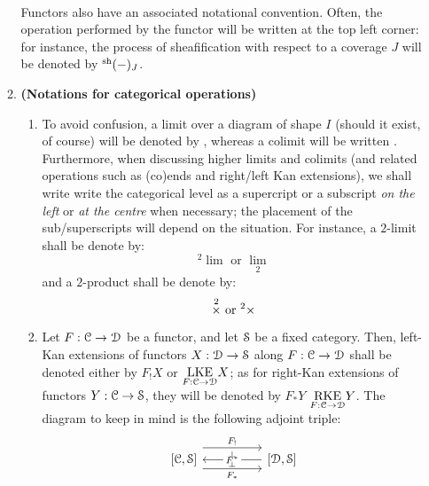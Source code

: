\begin{enumerate}
\begin{enumerate}
                \\
                Functors also have an associated notational convention. Often, the operation performed by the functor will be written at the top left corner: for instance, the process of sheafification with respect to a coverage $J$ will be denoted by ${}^{\sh}(-)_J$.
                \item \textbf{(Notations for categorical operations)} 
                    \begin{enumerate}
                        \item To avoid confusion, a limit over a diagram of shape $I$ (should it exist, of course) will be denoted by , whereas a colimit will be written . Furthermore, when discussing higher limits and colimits (and related operations such as (co)ends and right/left Kan extensions), we shall write write the categorical level as a supercript or a subscript \textit{on the left} or \textit{at the centre} when necessary; the placement of the sub/superscripts will depend on the situation. For instance, a $2$-limit shall be denote by:
                            $$\text{${}^2\lim$ or $\underset{2}{\lim}$}$$
                        and a $2$-product shall be denote by:
                            $$\text{$\x^2$ or ${}^2\x$}$$
                        \item Let $F: \C \to \D$ be a functor, and let $\S$ be a fixed  category. Then, left-Kan extensions of functors $X: \D \to \S$ along $F: \C \to \D$ shall be denoted either by $F_! X$ or $\underset{F: \C \to \D}{\LKE} X$; as for right-Kan extensions of functors $Y: \C \to \S$, they will be denoted by $F_* Y$ $\underset{F: \C \to \D}{\RKE} Y$. The diagram to keep in mind is the following adjoint triple:
                            $$
                                \begin{tikzcd}
                                	{[\C, \S]} && {[\D, \S]}
                                	\arrow[""{name=0, anchor=center, inner sep=0}, "{F^*}"{description}, from=1-3, to=1-1]
                                	\arrow[""{name=1, anchor=center, inner sep=0}, "{F_*}"', shift right=3, from=1-1, to=1-3]
                                	\arrow[""{name=2, anchor=center, inner sep=0}, "{F_!}", shift left=4, from=1-1, to=1-3]
                                	\arrow["\dashv"{anchor=center, rotate=-90}, draw=none, from=2, to=0]
                                	\arrow["\dashv"{anchor=center, rotate=-90}, draw=none, from=0, to=1]
                                \end{tikzcd}
$$
\end{enumerate}
\end{enumerate}
\end{enumerate}
